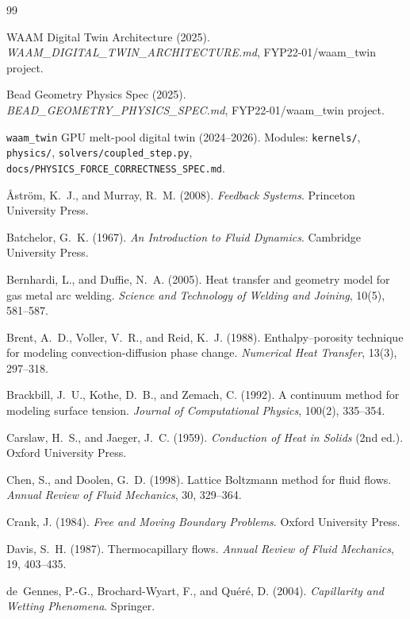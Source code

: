 \documentclass[11pt,a4paper]{article}
\begin{document}
\begin{thebibliography}{99}

WAAM Digital Twin Architecture (2025).
\textit{WAAM\_DIGITAL\_TWIN\_ARCHITECTURE.md}, FYP22-01/waam\_twin project.

Bead Geometry Physics Spec (2025).
\textit{BEAD\_GEOMETRY\_PHYSICS\_SPEC.md}, FYP22-01/waam\_twin project.

\texttt{waam\_twin} GPU melt-pool digital twin (2024--2026).
Modules: \texttt{kernels/}, \texttt{physics/}, \texttt{solvers/coupled\_step.py},
\texttt{docs/PHYSICS\_FORCE\_CORRECTNESS\_SPEC.md}.

{\AA}str\"om, K.~J., and Murray, R.~M. (2008).
\textit{Feedback Systems}. Princeton University Press.

Batchelor, G.~K. (1967).
\textit{An Introduction to Fluid Dynamics}. Cambridge University Press.

Bernhardi, L., and Duffie, N.~A. (2005).
Heat transfer and geometry model for gas metal arc welding.
\textit{Science and Technology of Welding and Joining}, 10(5), 581--587.

Brent, A.~D., Voller, V.~R., and Reid, K.~J. (1988).
Enthalpy--porosity technique for modeling convection-diffusion phase change.
\textit{Numerical Heat Transfer}, 13(3), 297--318.

Brackbill, J.~U., Kothe, D.~B., and Zemach, C. (1992).
A continuum method for modeling surface tension.
\textit{Journal of Computational Physics}, 100(2), 335--354.

Carslaw, H.~S., and Jaeger, J.~C. (1959).
\textit{Conduction of Heat in Solids} (2nd ed.). Oxford University Press.

Chen, S., and Doolen, G.~D. (1998).
Lattice Boltzmann method for fluid flows.
\textit{Annual Review of Fluid Mechanics}, 30, 329--364.

Crank, J. (1984).
\textit{Free and Moving Boundary Problems}. Oxford University Press.

Davis, S.~H. (1987).
Thermocapillary flows.
\textit{Annual Review of Fluid Mechanics}, 19, 403--435.

de~Gennes, P.-G., Brochard-Wyart, F., and Qu\'er\'e, D. (2004).
\textit{Capillarity and Wetting Phenomena}. Springer.


\end{thebibliography}
\end{document}
